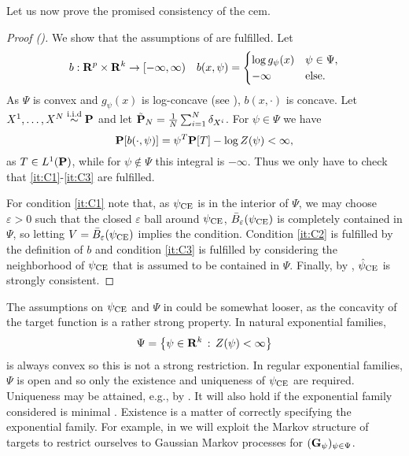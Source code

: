 Let us now prove the promised consistency of the \acrshort{cem}.
\begin{proof}[Proof ()]
    We show that the assumptions of  are fulfilled. Let
    \begin{align*}
        b: \R^{p}\times \R^{k} \to [-\infty, \infty) && b(x, \psi) = \begin{cases}
            \log g_{\psi}(x) & \psi \in \Psi, \\
            - \infty & \text{else.}
        \end{cases} 
    \end{align*}
    As $\Psi$ is convex and $g_{\psi}(x)$ is log-concave (see ), $b(x, \cdot)$ is concave. Let $X^{1}, \dots, X^{N} \iid \P$ and let $\tilde{\P}_{N} = \frac{1}{N} \sum_{i = 1}^N \delta_{X^{i}}$. For $\psi \in \Psi$ we have
    $$
    \P [b(\cdot, \psi)] = \psi^{T}\P[T] - \log Z(\psi) < \infty,
    $$
    as $T \in L^{1}(\P)$, while for $\psi \notin \Psi$ this integral is $-\infty$. Thus we only have to check that \ref{it:C1}-\ref{it:C3} are fulfilled. 
    
    For condition \ref{it:C1} note that, as $\pce$ is in the interior of $\Psi$, we may choose $\varepsilon > 0$ such that the closed $\varepsilon$ ball around $\pce$, $\bar B_{\varepsilon} (\pce)$ is completely contained in $\Psi$, so letting $V = \bar B_{\varepsilon} (\pce)$ implies the condition. Condition \ref{it:C2} is fulfilled by the definition of $b$ and condition \ref{it:C3} is fulfilled by considering the neighborhood of $\pce$ that is assumed to be contained in $\Psi$. Finally, by , $\hpce$ is strongly consistent.
\end{proof}

The assumptions on $\pce$ and $\Psi$ in  could be somewhat looser, as the concavity of the target function is a rather strong property. In natural exponential families, 
$$
\Psi = \left\{ \psi \in \R^{k} \,:\, Z(\psi) < \infty \right\}
$$
is always convex so this is not a strong restriction. In regular exponential families, $\Psi$ is open and so only the existence and uniqueness of $\pce$ are required. Uniqueness may be attained, e.g., by . It will also hold if the exponential family considered is minimal \citep[Corollary 2.5]{Brown1986Fundamentals}. Existence is a matter of correctly specifying the exponential family. For example, in  we will exploit the Markov structure of targets to restrict ourselves to Gaussian Markov processes for $(\G_{\psi})_{\psi \in \Psi}$. 

